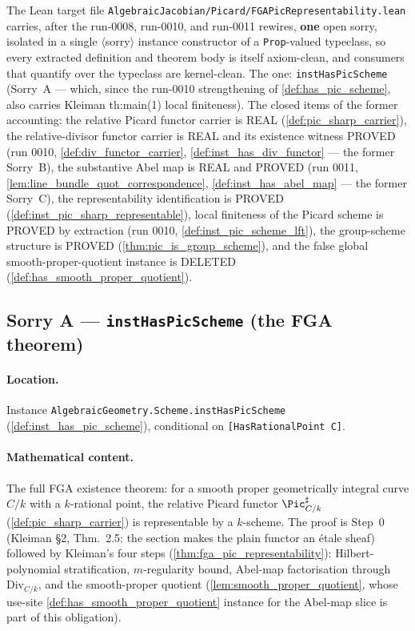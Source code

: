 The Lean target file
\texttt{AlgebraicJacobian/Picard/FGAPicRepresentability.lean} carries,
after the run-0008, run-0010, and run-0011 rewires, \textbf{one} open
sorry, isolated in a single \(\langle\)sorry\(\rangle\) instance
constructor of a \texttt{Prop}-valued typeclass, so every extracted
definition and theorem body is itself axiom-clean, and consumers that
quantify over the typeclass are kernel-clean. The one:
\texttt{instHasPicScheme} (Sorry~A --- which, since the run-0010
strengthening of \cref{def:has_pic_scheme}, also carries Kleiman
th:main(1) local finiteness). The closed items of the former accounting:
the relative Picard functor carrier is REAL (\cref{def:pic_sharp_carrier}),
the relative-divisor functor carrier is REAL and its existence witness
PROVED (run 0010, \cref{def:div_functor_carrier},
\cref{def:inst_has_div_functor} --- the former Sorry~B), the substantive
Abel map is REAL and PROVED (run 0011,
\cref{lem:line_bundle_quot_correspondence}, \cref{def:inst_has_abel_map}
--- the former Sorry~C), the representability identification is PROVED
(\cref{def:inst_pic_sharp_representable}), local finiteness of the Picard
scheme is PROVED by extraction (run 0010,
\cref{def:inst_pic_scheme_lft}), the group-scheme structure is
PROVED (\cref{thm:pic_is_group_scheme}), and the false global
smooth-proper-quotient instance is DELETED
(\cref{def:has_smooth_proper_quotient}).

\subsection{Sorry A --- \texttt{instHasPicScheme} (the FGA theorem)}
\label{subsec:sorry_has_pic_scheme}

\paragraph{Location.} Instance
\texttt{AlgebraicGeometry.Scheme.instHasPicScheme}
(\cref{def:inst_has_pic_scheme}), conditional on
\texttt{[HasRationalPoint C]}.

\paragraph{Mathematical content.} The full FGA existence theorem: for a
smooth proper geometrically integral curve \(C/k\) with a \(k\)-rational
point, the relative Picard functor \(\Pic^\sharp_{C/k}\)
(\cref{def:pic_sharp_carrier}) is representable by a \(k\)-scheme. The
proof is Step~0 (Kleiman \S 2, Thm.~2.5: the section makes the plain
functor an \'etale sheaf) followed by Kleiman's four steps
(\cref{thm:fga_pic_representability}): Hilbert-polynomial stratification,
\(m\)-regularity bound, Abel-map factorisation through
\(\mathrm{Div}_{C/k}\), and the smooth-proper quotient
(\cref{lem:smooth_proper_quotient}, whose use-site
\cref{def:has_smooth_proper_quotient} instance for the Abel-map slice is
part of this obligation).

